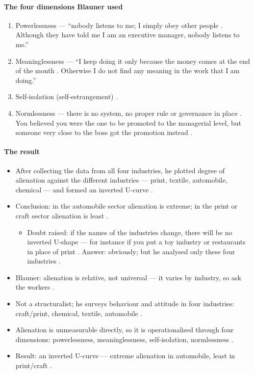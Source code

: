 \paragraph{The four dimensions Blauner used}
\begin{enumerate}
    \item Powerlessness --- ``nobody listens to me; I simply obey other people . Although they have told me I am an executive manager, nobody listens to me.'' 
    \item Meaninglessness --- ``I keep doing it only because the money comes at the end of the month . Otherwise I do not find any meaning in the work that I am doing.'' 
    \item Self-isolation (self-estrangement) .
    \item Normlessness --- there is no system, no proper rule or governance in place . You believed you were the one to be promoted to the managerial level, but someone very close to the boss got the promotion instead .
\end{enumerate}

\paragraph{The result}
\begin{itemize}
    \item After collecting the data from all four industries, he plotted degree of alienation against the different industries --- print, textile, automobile, chemical --- and formed an inverted U-curve .
    \item Conclusion: in the automobile sector alienation is extreme; in the print or craft sector alienation is least .
    \begin{itemize}
        \item Doubt raised: if the names of the industries change, there will be no inverted U-shape --- for instance if you put a toy industry or restaurants in place of print . Answer: obviously; but he analysed only these four industries .
    \end{itemize}
\end{itemize}

\begin{QuickRevision}
\begin{itemize}
    \item Blauner: alienation is relative, not universal --- it varies by industry, so ask the workers .
    \item Not a structuralist; he surveys behaviour and attitude in four industries: craft/print, chemical, textile, automobile .
    \item Alienation is unmeasurable directly, so it is operationalised through four dimensions: powerlessness, meaninglessness, self-isolation, normlessness .
    \item Result: an inverted U-curve --- extreme alienation in automobile, least in print/craft .
\end{itemize}
\end{QuickRevision}

